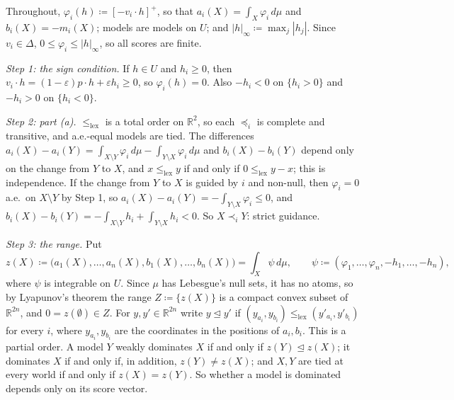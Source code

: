 \documentclass[11pt]{article}
\newcommand{\R}{\mathbb{R}}
\newcommand{\lexle}{\le_{\mathrm{lex}}}
\theoremstyle{plain}
\theoremstyle{definition}
\theoremstyle{remark}
\begin{document}
Throughout, $\varphi_i(h)\coloneqq[-v_i\cdot h]^+$, so that $a_i(X)=\int_X\varphi_i\,d\mu$ and
$b_i(X)=-m_i(X)$; models are models on $U$; and $|h|_\infty\coloneqq\max_j|h_j|$. Since $v_i\in
\Delta$, $0\le\varphi_i\le|h|_\infty$, so all scores are finite.

\emph{Step 1: the sign condition.} If $h\in U$ and $h_i\ge0$, then $v_i\cdot h=(1-\varepsilon)
p\cdot h+\varepsilon h_i\ge0$, so $\varphi_i(h)=0$. Also $-h_i<0$ on $\{h_i>0\}$ and $-h_i>0$ on
$\{h_i<0\}$.

\emph{Step 2: part (a).} $\lexle$ is a total order on $\R^2$, so each $\preceq_i$ is complete
and transitive, and a.e.-equal models are tied. The differences $a_i(X)-a_i(Y)=\int_{X\setminus
Y}\varphi_i\,d\mu-\int_{Y\setminus X}\varphi_i\,d\mu$ and $b_i(X)-b_i(Y)$ depend only on the
change from $Y$ to $X$, and $x\lexle y$ if and only if $0\lexle y-x$; this is independence. If
the change from $Y$ to $X$ is guided by $i$ and non-null, then $\varphi_i=0$ a.e.\ on $X\setminus
Y$ by Step 1, so $a_i(X)-a_i(Y)=-\int_{Y\setminus X}\varphi_i\le0$, and $b_i(X)-b_i(Y)=
-\int_{X\setminus Y}h_i+\int_{Y\setminus X}h_i<0$. So $X\prec_iY$: strict guidance.

\emph{Step 3: the range.} Put
\[
  z(X)\coloneqq\bigl(a_1(X),\dots,a_n(X),b_1(X),\dots,b_n(X)\bigr)=\int_X\psi\,d\mu,\qquad
  \psi\coloneqq(\varphi_1,\dots,\varphi_n,-h_1,\dots,-h_n),
\]
where $\psi$ is integrable on $U$. Since $\mu$
has Lebesgue's null sets, it has no atoms, so by Lyapunov's theorem
\cite{Lyapunov,Lindenstrauss} the range $Z\coloneqq\{z(X)\}$ is a compact convex subset of
$\R^{2n}$, and $0=z(\emptyset)\in Z$. For $y,y'\in\R^{2n}$ write $y\trianglelefteq y'$ if
$(y_{a_i},y_{b_i})\lexle(y'_{a_i},y'_{b_i})$ for every $i$, where $y_{a_i},y_{b_i}$ are the
coordinates in the positions of $a_i,b_i$. This is a partial order. A model $Y$ weakly dominates
$X$ if and only if $z(Y)\trianglelefteq z(X)$; it dominates $X$ if and only if, in addition,
$z(Y)\ne z(X)$; and $X,Y$ are tied at every world if and only if $z(X)=z(Y)$. So whether a model
is dominated depends only on its score vector.
\end{document}
